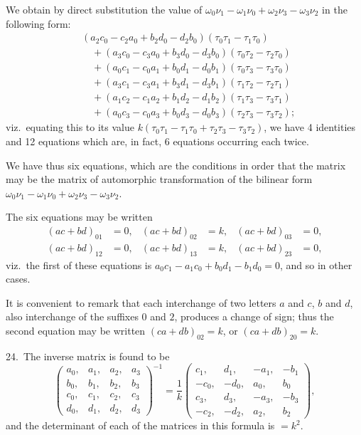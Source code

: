 \documentclass[11pt,a4paper]{book}
\begin{document}
We obtain by direct substitution the value of $\omega_0\nu_1 - \omega_1\nu_0 + \omega_2\nu_3 - \omega_3\nu_2$ in the following form:
\begin{align*}
&(a_2c_0 - c_2a_0 + b_2d_0 - d_2b_0)(\tau_0\tau_1 - \tau_1\tau_0)\\
&\quad + (a_3c_0 - c_3a_0 + b_3d_0 - d_3b_0)(\tau_0\tau_2 - \tau_2\tau_0)\\
&\quad + (a_0c_1 - c_0a_1 + b_0d_1 - d_0b_1)(\tau_0\tau_3 - \tau_3\tau_0)\\
&\quad + (a_3c_1 - c_3a_1 + b_3d_1 - d_3b_1)(\tau_1\tau_2 - \tau_2\tau_1)\\
&\quad + (a_1c_2 - c_1a_2 + b_1d_2 - d_1b_2)(\tau_1\tau_3 - \tau_3\tau_1)\\
&\quad + (a_0c_3 - c_0a_3 + b_0d_3 - d_0b_3)(\tau_2\tau_3 - \tau_3\tau_2);
\end{align*}
viz.\ equating this to its value $k(\tau_0\tau_1 - \tau_1\tau_0 + \tau_2\tau_3 - \tau_3\tau_2)$, we have 4 identities and 12 equations which are, in fact, 6 equations occurring each twice.

We have thus six equations, which are the conditions in order that the matrix may be the matrix of automorphic transformation of the bilinear form $\omega_0\nu_1 - \omega_1\nu_0 + \omega_2\nu_3 - \omega_3\nu_2$.

The six equations may be written
\begin{align*}
(ac + bd)_{01} &= 0, & (ac + bd)_{02} &= k, & (ac + bd)_{03} &= 0,\\
(ac + bd)_{12} &= 0, & (ac + bd)_{13} &= k, & (ac + bd)_{23} &= 0,
\end{align*}
viz.\ the first of these equations is $a_0c_1 - a_1c_0 + b_0d_1 - b_1d_0 = 0$, and so in other cases.

It is convenient to remark that each interchange of two letters $a$ and $c$, $b$ and $d$, also interchange of the suffixes $0$ and $2$, produces a change of sign; thus the second equation may be written $(ca + db)_{02} = k$, or $(ca + db)_{20} = k$.

\medskip

24.\ The inverse matrix is found to be
\[
\begin{pmatrix}
a_0, & a_1, & a_2, & a_3\\
b_0, & b_1, & b_2, & b_3\\
c_0, & c_1, & c_2, & c_3\\
d_0, & d_1, & d_2, & d_3
\end{pmatrix}^{-1}
= \frac{1}{k}
\begin{pmatrix}
c_1, & d_1, & -a_1, & -b_1\\
-c_0, & -d_0, & a_0, & b_0\\
c_3, & d_3, & -a_3, & -b_3\\
-c_2, & -d_2, & a_2, & b_2
\end{pmatrix},
\]
and the determinant of each of the matrices in this formula is $= k^2$.
\end{document}
